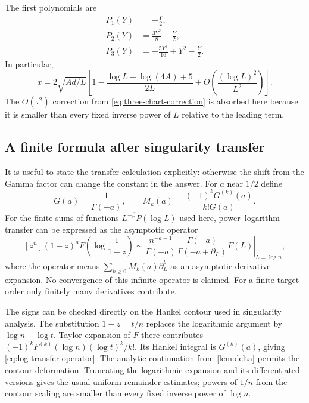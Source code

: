 The first polynomials are
\begin{align}
 P_1(Y)&=-\frac Y2,\label{eq:core-log-P1}\\
 P_2(Y)&=\frac{3Y^2}{8}-\frac Y2,\label{eq:core-log-P2}\\
 P_3(Y)&=-\frac{5Y^3}{16}+Y^2-\frac Y2.\label{eq:core-log-P3}
\end{align}
In particular,
\begin{equation}\label{eq:three-x-logarithmic}
 x=2\sqrt{Ad/L}\left[
 1-\frac{\log L-\log(4A)+5}{2L}
 +O\left(\frac{(\log L)^2}{L^2}\right)\right].
\end{equation}
The $O(\tau^2)$ correction from \eqref{eq:three-chart-correction}
is absorbed here because it is smaller than every fixed inverse power
of $L$ relative to the leading term.

\subsection{A finite formula after singularity transfer}

It is useful to state the transfer calculation explicitly: otherwise
the shift from the Gamma factor can change the constant in the answer.
For $a$ near $1/2$ define
\begin{equation}\label{eq:transfer-multipliers}
 G(a)=\frac1{\Gamma(-a)},\qquad
 M_k(a)=\frac{(-1)^kG^{(k)}(a)}{k!G(a)}.
\end{equation}
For the finite sums of functions $L^{-\beta}P(\log L)$ used here,
power--logarithm transfer \cite{FO} can be expressed as the asymptotic
operator
\begin{equation}\label{eq:log-transfer-operator}
 [z^n](1-z)^aF\left(\log\frac1{1-z}\right)
 \sim\frac{n^{-a-1}}{\Gamma(-a)}
 \left.\frac{\Gamma(-a)}{\Gamma(-a+\partial_L)}F(L)
 \right|_{L=\log n},
\end{equation}
where the operator means
$\sum_{k\ge0}M_k(a)\partial_L^k$ as an asymptotic derivative
expansion.  No convergence of this infinite operator is claimed.
For a finite target order only finitely many derivatives contribute.

The signs can be checked directly on the Hankel contour used in
singularity analysis.  The substitution $1-z=t/n$ replaces the
logarithmic argument by $\log n-\log t$.  Taylor expansion of $F$
there contributes $(-1)^kF^{(k)}(\log n)(\log t)^k/k!$.
Its Hankel integral is $G^{(k)}(a)$, giving
\eqref{eq:log-transfer-operator}.  The analytic continuation from
\cref{lem:delta} permits the contour deformation.  Truncating the
logarithmic expansion and its differentiated versions gives the usual
uniform remainder estimates; powers of $1/n$ from the contour scaling
are smaller than every fixed inverse power of $\log n$.

